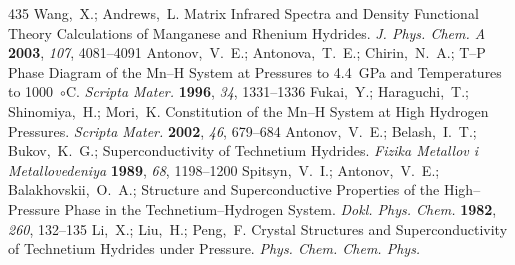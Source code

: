 \documentclass[12pt,letterpaper,oneside]{article}
\begin{document}
\begin{mcitethebibliography}{435}
\mciteSetBstMidEndSepPunct{\mcitedefaultmidpunct}
{\mcitedefaultendpunct}{\mcitedefaultseppunct}\relax
\EndOfBibitem
{}
Wang,~X.; Andrews,~L. Matrix Infrared Spectra and Density Functional Theory
  Calculations of Manganese and Rhenium Hydrides. \emph{J. Phys. Chem. A}
  \textbf{2003}, \emph{107}, 4081--4091\relax
\mciteBstWouldAddEndPuncttrue
\mciteSetBstMidEndSepPunct{\mcitedefaultmidpunct}
{\mcitedefaultendpunct}{\mcitedefaultseppunct}\relax
\EndOfBibitem
{}
Antonov,~V.~E.; Antonova,~T.~E.; Chirin,~N.~A.;
    T--P Phase Diagram of the Mn--H System at Pressures to
  4.4~GPa and Temperatures to 1000~$\circ$C. \emph{Scripta Mater.}
  \textbf{1996}, \emph{34}, 1331--1336\relax
\mciteBstWouldAddEndPuncttrue
\mciteSetBstMidEndSepPunct{\mcitedefaultmidpunct}
{\mcitedefaultendpunct}{\mcitedefaultseppunct}\relax
\EndOfBibitem
{}
Fukai,~Y.; Haraguchi,~T.; Shinomiya,~H.; Mori,~K. Constitution of the Mn--H
  System at High Hydrogen Pressures. \emph{Scripta Mater.} \textbf{2002},
  \emph{46}, 679--684\relax
\mciteBstWouldAddEndPuncttrue
\mciteSetBstMidEndSepPunct{\mcitedefaultmidpunct}
{\mcitedefaultendpunct}{\mcitedefaultseppunct}\relax
\EndOfBibitem
{}
Antonov,~V.~E.; Belash,~I.~T.; Bukov,~K.~G.;   Superconductivity of Technetium Hydrides.
  \emph{Fizika Metallov i Metallovedeniya} \textbf{1989}, \emph{68},
  1198--1200\relax
\mciteBstWouldAddEndPuncttrue
\mciteSetBstMidEndSepPunct{\mcitedefaultmidpunct}
{\mcitedefaultendpunct}{\mcitedefaultseppunct}\relax
\EndOfBibitem
{}
Spitsyn,~V.~I.; Antonov,~V.~E.; Balakhovskii,~O.~A.;   Structure and Superconductive Properties
  of the High--Pressure Phase in the Technetium--Hydrogen System. \emph{Dokl.
  Phys. Chem.} \textbf{1982}, \emph{260}, 132--135\relax
\mciteBstWouldAddEndPuncttrue
\mciteSetBstMidEndSepPunct{\mcitedefaultmidpunct}
{\mcitedefaultendpunct}{\mcitedefaultseppunct}\relax
\EndOfBibitem
{}
Li,~X.; Liu,~H.; Peng,~F. Crystal Structures and Superconductivity of
  Technetium Hydrides under Pressure. \emph{Phys. Chem. Chem. Phys.}

\end{mcitethebibliography}
\end{document}
